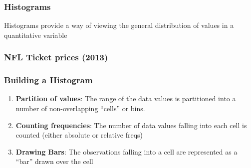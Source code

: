 \documentclass[12pt]{beamer}\usepackage[]{graphicx}\usepackage[]{color}
\makeatletter
\newenvironment{kframe}{%
 \def\at@end@of@kframe{}%
 \ifinner\ifhmode%
  \def\at@end@of@kframe{\end{minipage}}%
  \begin{minipage}{\columnwidth}%
 \fi\fi%
 \def\FrameCommand##1{\hskip\@totalleftmargin \hskip-\fboxsep
 \colorbox{shadecolor}{##1}\hskip-\fboxsep
     \hskip-\linewidth \hskip-\@totalleftmargin \hskip\columnwidth}%
 \MakeFramed {\advance\hsize-\width
   \@totalleftmargin\z@ \linewidth\hsize
   \@setminipage}}%
 {\par\unskip\endMakeFramed%
 \at@end@of@kframe}
\newenvironment{knitrout}{}{} %
\makeatother
\begin{document}

\begin{frame}
\begin{center}
\Huge{}
\end{center}
\end{frame}


\begin{frame}
\frametitle{Histograms}
Histograms provide a way of viewing the general distribution of values in a quantitative variable
\end{frame}


\begin{frame}[fragile]
\frametitle{NFL Ticket prices (2013)}
\begin{knitrout}\footnotesize
{}\color{fgcolor}\begin{kframe}


{\ttfamily\noindent\bfseries{}}

{\ttfamily\noindent\bfseries\color{errorcolor}{\#\# Error in axis(side = 1, at = seq(50, 120, 10)): plot.new has not been called yet}}

{\ttfamily\noindent\bfseries{}}

{\ttfamily\noindent\bfseries\color{errorcolor}{\#\# Error in axis(side = 2, at = seq(0, 8, 2), las = 2): plot.new has not been called yet}}

{\ttfamily\noindent\bfseries{}}\end{kframe}
\end{knitrout}

\end{frame}


\begin{frame}
\frametitle{Building a Histogram}

\begin{enumerate}
  \item \textbf{Partition of values}: The range of the data values is partitioned into a number of non-overlapping ``cells'' or bins.
  \item \textbf{Counting frequencies}: The number of data values falling into each cell is counted (either absolute or relative freqs)
  \item \textbf{Drawing Bars}: The observations falling into a cell are represented as a ``bar'' drawn over the cell
\end{enumerate}

\end{frame}
\end{document}
